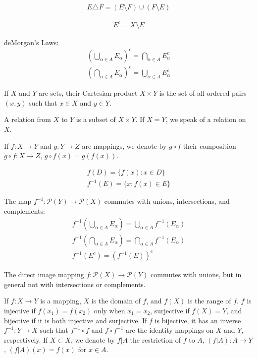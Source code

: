 \begin{align}
E \triangle F = (E \setminus F) \cup (F \setminus E)
\end{align}

\begin{align}
E^c = X \setminus E
\end{align}

deMorgan's Laws:
\begin{align}
(\bigcup_{\alpha \in A} E_{\alpha})^{c} = \bigcap_{\alpha \in A} E_{\alpha}^{c} \\
(\bigcap_{\alpha \in A} E_{\alpha})^{c} = \bigcup_{\alpha \in A} E_{\alpha}^{c}
\end{align}

If $X$ and $Y$ are sets, their Cartesian product $X \times Y$ is the set of all ordered pairs $(x, y)$ such that $x \in X$ and $y \in Y$. 

A relation from $X$ to $Y$ is a subset of $X \times Y$.
If $X=Y$, we speak of a relation on $X$.

If $f: X \to Y$ and $g: Y \to Z$ are mappings, we denote by $g \circ f$ their composition $g \circ f: X \to Z$, $g \circ f (x) = g(f(x))$.

\begin{align}
f(D) = \{ f(x) : x \in D \} \\
f^{-1}(E) = \{ x : f(x) \in E \}
\end{align}

The map $f^{-1}: \mathcal{P}(Y) \to \mathcal{P}(X)$ commutes with unions, intersections, and complements:
\begin{align}
f^{-1} (\bigcup_{\alpha \in A} E_{\alpha}) = \bigcup_{\alpha \in A} f^{-1}(E_{\alpha}) \\
f^{-1} (\bigcap_{\alpha \in A} E_{\alpha}) = \bigcap_{\alpha \in A} f^{-1}(E_{\alpha}) \\
f^{-1} (E^{c}) = (f^{-1}(E))^{c}
\end{align}

The direct image mapping $f: \mathcal{P}(X) \to \mathcal{P}(Y)$ commutes with unions, but in general not with intersections or complements.

If $f: X \to Y$ is a mapping, $X$ is the domain of $f$, and $f(X)$ is the range of $f$.
$f$ is injective if $f(x_1) = f(x_2)$ only when $x_1 = x_2$, surjective if $f(X) = Y$, and bijective if it is both injective and surjective.
If $f$ is bijective, it has an inverse $f^{-1}: Y \to X$ such that $f^{-1} \circ f$ and $f \circ f^{-1}$ are the identity mappings on $X$ and $Y$, respectively.
If $X \subset X$, we denote by $f|A$ the restriction of $f$ to $A$, $(f|A): A \to Y$, $(f|A)(x) = f(x)$ for $x \in A$.

